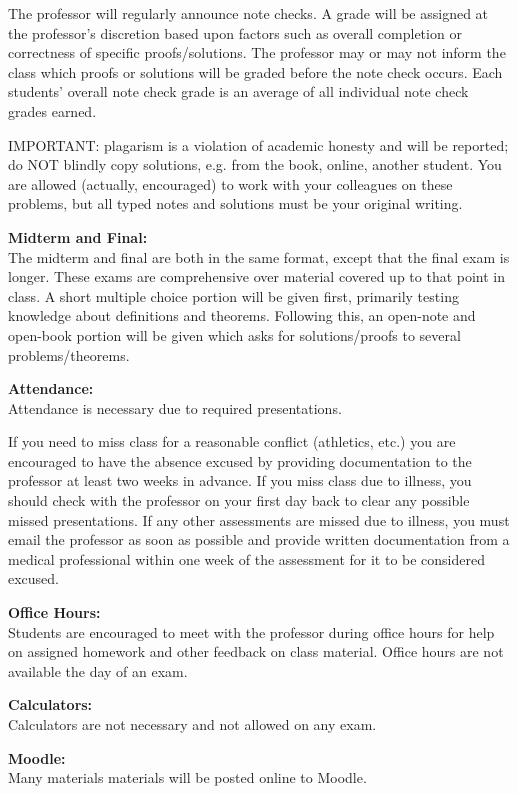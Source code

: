 {The professor will regularly announce
note checks. A grade will be assigned at the professor's discretion based
upon factors such as overall completion or correctness of specific
proofs/solutions.
The professor may or may not inform the class which proofs or solutions will
be graded before the note check occurs.
Each students' overall note check grade is an average of all individual
note check grades earned.

IMPORTANT: plagarism is a violation
of academic honesty and will be reported; do NOT blindly copy solutions, e.g.
from the book, online, another student.
You are allowed (actually, encouraged) to work
with your colleagues on these problems, but all typed notes and solutions
must be your original writing.

\textbf{Midterm and Final:} \\
The midterm and final are both in the same format, except that the final
exam is longer. These exams are comprehensive over material covered up
to that point in class. A short multiple choice portion will be given first,
primarily testing knowledge about definitions and theorems. Following this, an
open-note and open-book portion will be given which asks for solutions/proofs
to several problems/theorems.

\newpage
\textbf{Attendance:} \\
Attendance is necessary due to
required presentations.

If you need to miss
class for a reasonable conflict (athletics, etc.) you are encouraged to
have the absence excused by providing documentation to
the professor at least two weeks in advance.
If you miss class due to illness, you should check with the professor
on your first day back to clear any possible missed presentations.
If any other assessments are missed due to illness, you
must email the professor as soon as possible and provide written
documentation from a medical professional within one week of the assessment
for it to be considered excused.

\textbf{Office Hours:} \\
Students are encouraged to meet with the professor during office hours
for help on assigned homework and other feedback on class material.
Office hours are not available the day of an exam.

\textbf{Calculators:} \\
Calculators are not necessary and not allowed on any exam.

\textbf{Moodle:}\\
Many materials materials will be posted online to Moodle.
}

